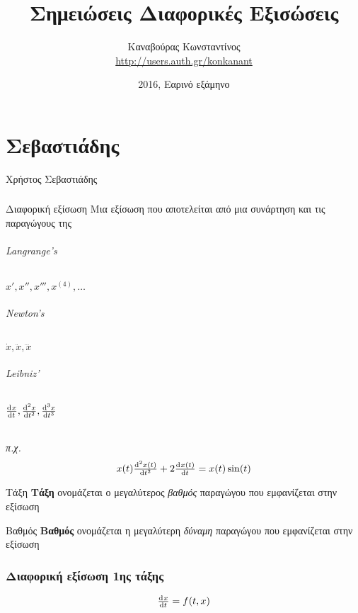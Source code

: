 \documentclass[11pt,a4paper,titlepage,final]{article}
\title{Σημειώσεις Διαφορικές Εξισώσεις}
\date{2016, Εαρινό εξάμηνο}
\author{Καναβούρας Κωνσταντίνος \\ \textlatin{\url{http://users.auth.gr/konkanant}}}
\begin{document}
\maketitle

\tableofcontents

\newpage

\part{Σεβαστιάδης}
Χρήστος Σεβαστιάδης

\section{}

\begin{defn*}{Διαφορική εξίσωση}
Μια εξίσωση που αποτελείται από μια συνάρτηση και τις παραγώγους της
\end{defn*}

\paragraph{\textlatin{Langrange's}}
\(x',x'',x''',x^{(4)},\dots\)
\paragraph{\textlatin{Newton's}}
\(\dot{x}, \ddot{x}, \dddot{x}\)
\paragraph{\textlatin{Leibniz'}}
\(\od{x}{t}, \od[2]{x}{t}, \od[3]{x}{t}\)

\paragraph{}
\textit{π.χ.}
\[
x(t) \od[2]{x(t)}{t} + 2 \od{x(t)}{t}=x(t)\sin (t)
\]

\begin{defn}{Τάξη}{}
\textbf{Τάξη} ονομάζεται ο μεγαλύτερος \emph{βαθμός} παραγώγου που εμφανίζεται στην εξίσωση
\end{defn}

\begin{defn}{Βαθμός}{}
\textbf{Βαθμός} ονομάζεται η μεγαλύτερη \emph{δύναμη} παραγώγου που εμφανίζεται στην εξίσωση
\end{defn}


\section{Διαφορική εξίσωση 1ης τάξης}
\begin{defn*}{}
\[
\od{x}{t}=f(t,x)
\]
\end{defn*}
\end{document}
